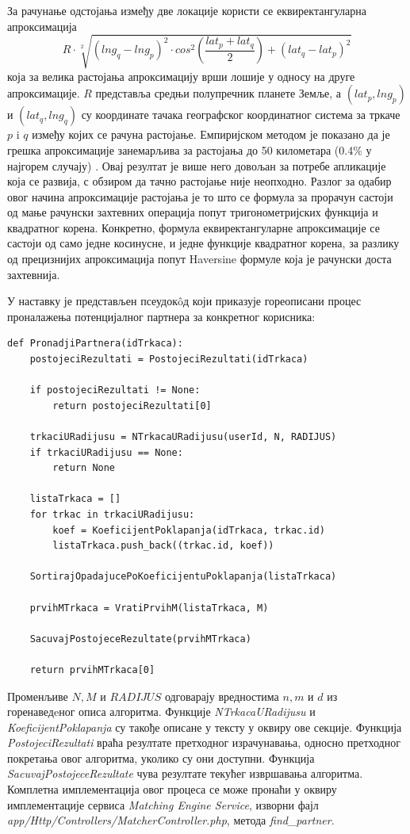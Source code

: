 \documentclass[12pt,oneside]{memoir}
\begin{document}
За рачунање одстојања између две локације користи се еквиректангуларна апроксимација \cite{distance_approximation} \[R \cdot \sqrt[2]{(lng_q - lng_p)^2 \cdot cos^2(\frac{lat_p + lat_q}{2}) + (lat_q - lat_p)^2}\] која за велика растојања апроксимацију врши лошије у односу на друге апроксимације. $R$ представља средњи полупречник планете Земље, а $(lat_p, lng_p)$ и $(lat_q, lng_q)$ су координате тачака географског координатног система за тркаче $p$ i $q$ између којих се рачуна растојање. Емпиријском методом је показано да је грешка апроксимације занемарљива за растојања до 50 километара (0.4\% у најгорем случају) \cite{geographic_distance_article}. Овај резултат је више него довољан за потребе апликације која се развија, с обзиром да тачно растојање није неопходно. Разлог за одабир овог начина апроксимације растојања је то што се формула за прорачун састоји од мање рачунски захтевних операција попут тригонометријских функција и квадратног корена. Конкретно, формула еквиректангуларне апроксимације се састоји од само једне косинусне, и једне функције квадратног корена, за разлику од прецизнијих апроксимација попут Haversine формуле \cite{distance_approximation} која је рачунски доста захтевнија.

У наставку је представљен псеудокôд који приказује гореописани процес проналажења потенцијалног партнера за конкретног корисника:
\begin{english}
\begin{lstlisting}
def PronadjiPartnera(idTrkaca):
    postojeciRezultati = PostojeciRezultati(idTrkaca)

    if postojeciRezultati != None:
        return postojeciRezultati[0]

    trkaciURadijusu = NTrkacaURadijusu(userId, N, RADIJUS)
    if trkaciURadijusu == None:
        return None

    listaTrkaca = []
    for trkac in trkaciURadijusu:
        koef = KoeficijentPoklapanja(idTrkaca, trkac.id)
        listaTrkaca.push_back((trkac.id, koef))

    SortirajOpadajucePoKoeficijentuPoklapanja(listaTrkaca)

    prvihMTrkaca = VratiPrvihM(listaTrkaca, M)
    
    SacuvajPostojeceRezultate(prvihMTrkaca)

    return prvihMTrkaca[0]
\end{lstlisting}
\end{english}
Променљиве $N, M$ и $RADIJUS$ одговарају вредностима $n, m$ и $d$ из горенаведeног описа алгоритма. Функције \textit{NTrkacaURadijusu} и \textit{KoeficijentPoklapanja} су такође описане у тексту у оквиру ове секције. Функција \textit{PostojeciRezultati} враћа резултате претходног израчунавања, односно претходног покретања овог алгоритма, уколико су они доступни. Функција \textit{SacuvajPostojeceRezultate} чува резултате текућег извршавања алгоритма. Комплетна имплементација овог процеса се може пронаћи у оквиру имплементације сервиса \textit{Matching Engine Service}, изворни фајл \textit{app/Http/Controllers/MatcherController.php}, метода \textit{find\_partner}.
\end{document}
